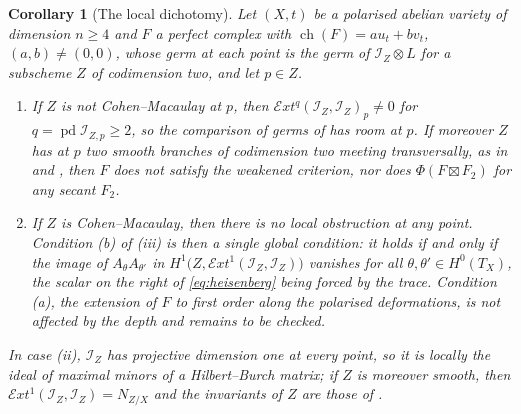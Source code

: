 \documentclass[11pt,reqno]{amsart}
\theoremstyle{plain}
\newtheorem{corollary}[theorem]{Corollary}
\theoremstyle{definition}
\theoremstyle{remark}
\newcommand{\cE}{\mathcal{E}}
\newcommand{\cI}{\mathcal{I}}
\DeclareMathOperator{\ch}{ch}
\begin{document}
\begin{corollary}[The local dichotomy]%
\label{cor:cmdichotomy}
Let $(X,t)$ be a polarised abelian variety of dimension $n\ge4$ and $F$ a
perfect complex with $\ch(F)=au_{t}+bv_{t}$, $(a,b)\ne(0,0)$, whose germ at
each point is the germ of $\cI_{Z}\otimes L$ for a subscheme $Z$ of
codimension two, and let $p\in Z$.
\begin{enumerate}[label=\textup{(\roman*)},leftmargin=2.6em]
\item If $Z$ is not Cohen--Macaulay at $p$, then
  $\cE xt^{q}(\cI_{Z},\cI_{Z})_{p}\ne0$ for $q=\operatorname{pd}\cI_{Z,p}\ge2$,
  so the comparison of germs of  has room at $p$. If moreover
  $Z$ has at $p$ two smooth branches of codimension two meeting
  transversally, as in  and
  , then $F$ does not satisfy the weakened
  criterion, nor does $\Phi(F\boxtimes F_{2})$ for any secant $F_{2}$.
\item If $Z$ is Cohen--Macaulay, then there is no local obstruction at any
  point. Condition (b) of (iii) is then a single global
  condition: it holds if and only if the image of $A_{\theta}A_{\theta'}$ in
  $H^{1}\bigl(Z,\cE xt^{1}(\cI_{Z},\cI_{Z})\bigr)$ vanishes for all
  $\theta,\theta'\in H^{0}(T_{X})$, the scalar on the right of
  \eqref{eq:heisenberg} being forced by the trace. Condition (a), the
  extension of $F$ to first order along the polarised deformations, is
  not affected by the depth and remains to be checked.
\end{enumerate}
In case (ii), $\cI_{Z}$ has projective dimension one at every point, so it is
locally the ideal of maximal minors of a Hilbert--Burch matrix; if $Z$ is
moreover smooth, then $\cE xt^{1}(\cI_{Z},\cI_{Z})=N_{Z/X}$ and the invariants
of $Z$ are those of .
\end{corollary}
\end{document}
